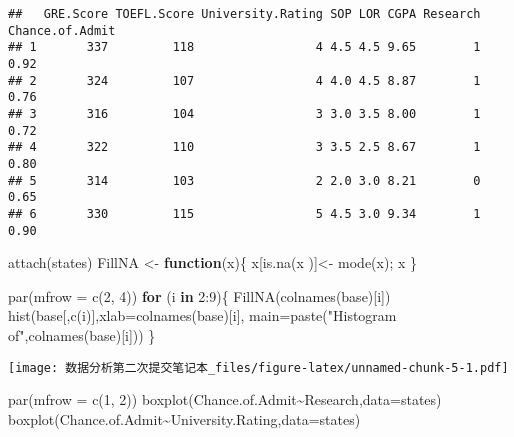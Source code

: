 \documentclass[
]{article}
\newenvironment{Shaded}{\begin{snugshade}}{\end{snugshade}}
\newcommand{\AttributeTok}[1]{\textcolor[rgb]{0.77,0.63,0.00}{#1}}
\newcommand{\ControlFlowTok}[1]{\textcolor[rgb]{0.13,0.29,0.53}{\textbf{#1}}}
\newcommand{\DecValTok}[1]{\textcolor[rgb]{0.00,0.00,0.81}{#1}}
\newcommand{\FunctionTok}[1]{\textcolor[rgb]{0.00,0.00,0.00}{#1}}
\newcommand{\NormalTok}[1]{#1}
\newcommand{\OtherTok}[1]{\textcolor[rgb]{0.56,0.35,0.01}{#1}}
\newcommand{\SpecialCharTok}[1]{\textcolor[rgb]{0.00,0.00,0.00}{#1}}
\newcommand{\StringTok}[1]{\textcolor[rgb]{0.31,0.60,0.02}{#1}}
\begin{document}
\begin{verbatim}
##   GRE.Score TOEFL.Score University.Rating SOP LOR CGPA Research Chance.of.Admit
## 1       337         118                 4 4.5 4.5 9.65        1            0.92
## 2       324         107                 4 4.0 4.5 8.87        1            0.76
## 3       316         104                 3 3.0 3.5 8.00        1            0.72
## 4       322         110                 3 3.5 2.5 8.67        1            0.80
## 5       314         103                 2 2.0 3.0 8.21        0            0.65
## 6       330         115                 5 4.5 3.0 9.34        1            0.90
\end{verbatim}

\begin{Shaded}
\begin{Highlighting}[]
\FunctionTok{attach}\NormalTok{(states)}
\NormalTok{FillNA }\OtherTok{\textless{}{-}} \ControlFlowTok{function}\NormalTok{(x)\{}
\NormalTok{  x[}\FunctionTok{is.na}\NormalTok{(x )]}\OtherTok{\textless{}{-}} \FunctionTok{mode}\NormalTok{(x);}
\NormalTok{  x}
\NormalTok{\}}
\end{Highlighting}
\end{Shaded}

\begin{Shaded}
\begin{Highlighting}[]
\FunctionTok{par}\NormalTok{(}\AttributeTok{mfrow =} \FunctionTok{c}\NormalTok{(}\DecValTok{2}\NormalTok{, }\DecValTok{4}\NormalTok{))}
\ControlFlowTok{for}\NormalTok{ (i }\ControlFlowTok{in} \DecValTok{2}\SpecialCharTok{:}\DecValTok{9}\NormalTok{)\{}
  \FunctionTok{FillNA}\NormalTok{(}\FunctionTok{colnames}\NormalTok{(base)[i])}
  \FunctionTok{hist}\NormalTok{(base[,}\FunctionTok{c}\NormalTok{(i)],}\AttributeTok{xlab=}\FunctionTok{colnames}\NormalTok{(base)[i],}
       \AttributeTok{main=}\FunctionTok{paste}\NormalTok{(}\StringTok{"Histogram of"}\NormalTok{,}\FunctionTok{colnames}\NormalTok{(base)[i]))}
\NormalTok{\}}
\end{Highlighting}
\end{Shaded}

\texttt{[image: 数据分析第二次提交笔记本\_files/figure-latex/unnamed-chunk-5-1.pdf]}

\begin{Shaded}
\begin{Highlighting}[]
\FunctionTok{par}\NormalTok{(}\AttributeTok{mfrow =} \FunctionTok{c}\NormalTok{(}\DecValTok{1}\NormalTok{, }\DecValTok{2}\NormalTok{))}
\FunctionTok{boxplot}\NormalTok{(Chance.of.Admit}\SpecialCharTok{\textasciitilde{}}\NormalTok{Research,}\AttributeTok{data=}\NormalTok{states)}
\FunctionTok{boxplot}\NormalTok{(Chance.of.Admit}\SpecialCharTok{\textasciitilde{}}\NormalTok{University.Rating,}\AttributeTok{data=}\NormalTok{states)}
\end{Highlighting}
\end{Shaded}
\end{document}
